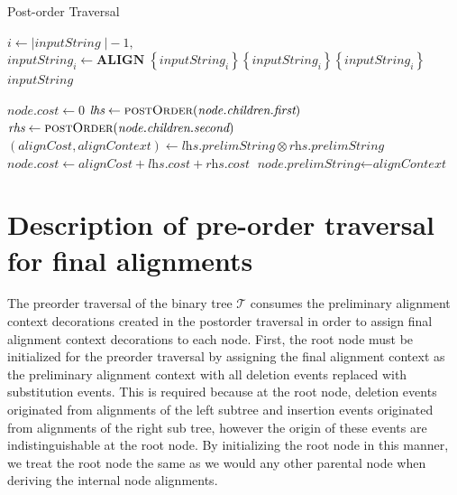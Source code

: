 \documentclass[11pt]{article}
\begin{document}
\begin{algorithm}
  \caption{Post-order Traversal}\label{postOrder}
  \begin{algorithmic}[1]
      \State $i \gets \vert\textit{inputString} \;\vert - 1,$
        \State $\textit{inputString}_i \gets \textbf{ALIGN} \; \left\{ \textit{inputString}_i\right\} \left\{ \textit{inputString}_i \right\} \left\{ \textit{inputString}_i \right\}$
      \EndWhile
      \Return $\textit{inputString}$
    \EndFunction

        \State $\textit{node.cost} \gets 0$
      \Else
        \State $\textit{lhs}  \gets \Call{postOrder}{\textit{node.children.first}}$
        \State $\textit{rhs}  \gets \Call{postOrder}{\textit{node.children.second}}$
        \State $\left(\textit{alignCost}, \textit{alignContext}\right) \gets \textit{lhs.prelimString} \otimes \textit{rhs.prelimString}$
        \State $\textit{node.cost} \gets \textit{alignCost} + \textit{lhs.cost} + \textit{rhs.cost}$
        \State $\textit{node.prelimString} \gets \textit{alignContext}$
      \EndIf
    \EndFunction
  \end{algorithmic}
\end{algorithm}


\section{Description of pre-order traversal for final alignments}
The preorder traversal of the binary tree $\mathcal{T}$ consumes the preliminary alignment context decorations created in the postorder traversal in order to assign final alignment context decorations to each node.
First, the root node must be initialized for the preorder traversal by assigning the final alignment context as the preliminary alignment context with all deletion events replaced with substitution events.
This is required because at the root node, deletion events originated from  alignments of the left subtree and insertion events originated from alignments of the right sub tree, however the origin of these events are indistinguishable at the root node.
By initializing the root node in this manner, we treat the root node the same as we would any other parental node when deriving the internal node alignments.
\end{document}
